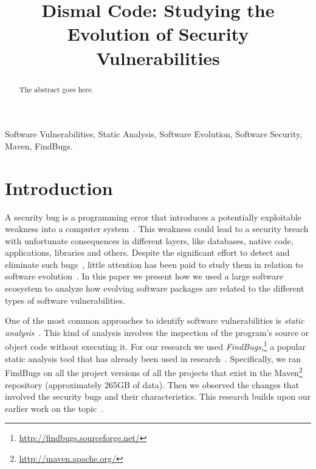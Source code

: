 \documentclass[conference]{IEEEtran}
\begin{document}
\title{Dismal Code: Studying the Evolution of Security Vulnerabilities}


\author{
\and
{}
}

\maketitle

\begin{abstract}
The abstract goes here.
\end{abstract}

\begin{IEEEkeywords}
Software Vulnerabilities, Static Analysis, Software Evolution, Software
Security, Maven, FindBugs.
\end{IEEEkeywords}

\IEEEpeerreviewmaketitle

\section{Introduction}

A security bug is a programming error that introduces a potentially
exploitable weakness into a computer system~\cite{SSL12}. This weakness could lead to a
security breach with unfortunate consequences in different layers, like databases,
native code, applications, libraries and others. Despite the significant
effort to detect and eliminate such bugs~\cite{SZ12}, little attention has been paid to
study them in relation to software evolution~\cite{L96, LRWPT97, IB06}. In this paper we present how we
used a large software ecosystem to analyze how evolving software packages are
related to the different types of software vulnerabilities.

One of the most common approaches to identify software vulnerabilities is
{\it static analysis}~\cite{CW07}. This kind of analysis involves the
inspection of the program's source or object code without executing
it. For our research we used {\it FindBugs},\footnote{\url{http://findbugs.sourceforge.net/}}
a popular static analysis tool that has already been used in
research~\cite{AP10, HP07}. Specifically, we ran FindBugs on all the project
versions of all the projects that exist in the Maven\footnote{\url{http://maven.apache.org/}}
repository (approximately 265GB of data). Then we observed the changes that
involved the security bugs and their characteristics. This research builds upon
our earlier work on the topic~\cite{MGS12}.
\end{document}
